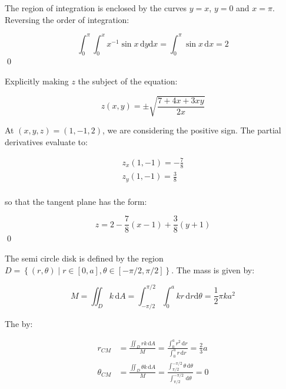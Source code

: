 \documentclass[12pt]{article}
\begin{document}
The region of integration is enclosed by the curves $y = x$, $y = 0$ and $x = \pi$. Reversing the order of integration:

\begin{equation}
    \int_{0}^{\pi} \int_{0}^{x} x^{-1} \sin{x} \, \mathrm{d}y \mathrm{d}x = \int_{0}^{\pi} \sin{x} \, \mathrm{d}x = 2
\end{equation}
\qed


Explicitly making $z$ the subject of the equation:

\begin{equation}
    z(x, y) = \pm \sqrt{\frac{7 + 4x + 3xy}{2x}}
\end{equation}

At $(x, y, z) = (1, -1, 2)$, we are considering the positive sign. The partial derivatives evaluate to:

\begin{equation}
    \begin{split}
        z_{x}(1, -1) = -\frac{7}{8} \\
        z_{y}(1, -1) = \frac{3}{8} \\
    \end{split}
\end{equation}

so that the tangent plane has the form:

\begin{equation}
    z = 2 - \frac{7}{8} (x - 1) + \frac{3}{8} (y + 1)
\end{equation}
\qed



The semi circle disk is defined by the region $D = \left\{ (r, \theta) \mid r \in [0, a], \theta \in [-\pi/2, \pi/2] \right\}$. The mass is given by:

\begin{equation}
    M = \iint_{D} k \, \mathrm{d}A = \int_{-\pi/2}^{\pi/2} \int_{0}^{a} k r \, \mathrm{d}r \mathrm{d}\theta = \frac{1}{2} \pi k a^{2}
\end{equation}

The  by:

\begin{equation}
    \begin{split}
        r_{CM} &= \frac{\iint_{D} r k \, \mathrm{d}A}{M} = \frac{\int_{0}^{a} r^{2} \, \mathrm{d}r}{\int_{0}^{a} r \, \mathrm{d}r} = \frac{2}{3} a \\
        \theta_{CM} &= \frac{\iint_{D} \theta k \, \mathrm{d}A}{M} = \frac{\int_{\pi/2}^{-\pi/2} \theta \, \mathrm{d}\theta}{\int_{\pi/2}^{-\pi/2} \, \mathrm{d}\theta} = 0
    \end{split}
\end{equation}
\end{document}

